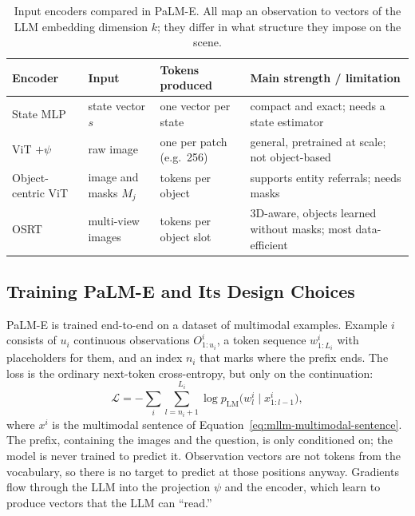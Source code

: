 \begin{table}[ht]
  \centering
  \begin{tabular}{@{}p{2.6cm}p{3.1cm}p{3.6cm}p{4.2cm}@{}}
    \toprule
    Encoder & Input & Tokens produced & Main strength / limitation \\
    \midrule
    State MLP & state vector $s$ & one vector per state & compact and exact;
      needs a state estimator \\
    ViT $+\psi$ & raw image & one per patch (e.g.\ 256) & general, pretrained
      at scale; not object-based \\
    Object-centric ViT & image and masks $M_j$ & tokens per object & supports
      entity referrals; needs masks \\
    OSRT & multi-view images & tokens per object slot & 3D-aware, objects
      learned without masks; most data-efficient \\
    \bottomrule
  \end{tabular}
  \caption{Input encoders compared in PaLM-E. All map an observation to
  vectors of the LLM embedding dimension $k$; they differ in what structure
  they impose on the scene.}
  \label{tab:palme-encoders}
\end{table}

\subsection{Training PaLM-E and Its Design Choices}

PaLM-E is trained end-to-end on a dataset of multimodal examples. Example $i$
consists of $u_i$ continuous observations $O^i_{1:u_i}$, a token sequence
$w^i_{1:L_i}$ with placeholders for them, and an index $n_i$ that marks where
the prefix ends. The loss is the ordinary next-token cross-entropy, but only
on the continuation:
\begin{equation}
  \mathcal L = -\sum_i \sum_{l=n_i+1}^{L_i}
    \log p_{\mathrm{LM}}\bigl(w^i_l \mid x^i_{1:l-1}\bigr),
  \label{eq:mllm-loss}
\end{equation}
\noindent
where $x^i$ is the multimodal sentence of
Equation~\ref{eq:mllm-multimodal-sentence}. The prefix, containing the
images and the question, is only conditioned on; the model is never trained
to predict it. Observation vectors are not tokens from the vocabulary, so
there is no target to predict at those positions anyway. Gradients flow
through the LLM into the projection $\psi$ and the encoder, which learn to
produce vectors that the LLM can ``read.''

